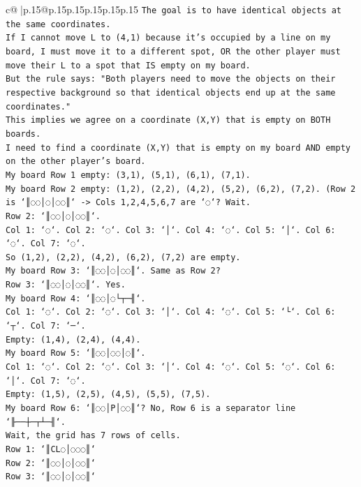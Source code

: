 \documentclass{article}
\begin{document}
{\begin{supertabular}{c@{$\;$}|p{.15\linewidth}@{}p{.15\linewidth}p{.15\linewidth}p{.15\linewidth}p{.15\linewidth}p{.15\linewidth}}
{{{\texttt{The goal is to have identical objects at the same coordinates.} \\
\texttt{If I cannot move L to (4,1) because it's occupied by a line on my board, I must move it to a different spot, OR the other player must move their L to a spot that IS empty on my board.} \\
\texttt{But the rule says: "Both players need to move the objects on their respective background so that identical objects end up at the same coordinates."} \\
\texttt{This implies we agree on a coordinate (X,Y) that is empty on BOTH boards.} \\
\texttt{I need to find a coordinate (X,Y) that is empty on my board AND empty on the other player's board.} \\
\texttt{My board Row 1 empty: (3,1), (5,1), (6,1), (7,1).} \\
\texttt{My board Row 2 empty: (1,2), (2,2), (4,2), (5,2), (6,2), (7,2). (Row 2 is `║◌◌│◌│◌◌║` {-}> Cols 1,2,4,5,6,7 are `◌`? Wait.} \\
\texttt{Row 2: `║◌◌│◌│◌◌║`.} \\
\texttt{Col 1: `◌`. Col 2: `◌`. Col 3: `│`. Col 4: `◌`. Col 5: `│`. Col 6: `◌`. Col 7: `◌`.} \\
\texttt{So (1,2), (2,2), (4,2), (6,2), (7,2) are empty.} \\
\texttt{My board Row 3: `║◌◌│◌│◌◌║`. Same as Row 2?} \\
\texttt{Row 3: `║◌◌│◌│◌◌║`. Yes.} \\
\texttt{My board Row 4: `║◌◌│◌└┬─╢`.} \\
\texttt{Col 1: `◌`. Col 2: `◌`. Col 3: `│`. Col 4: `◌`. Col 5: `└`. Col 6: `┬`. Col 7: `─`.} \\
\texttt{Empty: (1,4), (2,4), (4,4).} \\
\texttt{My board Row 5: `║◌◌│◌◌│◌║`.} \\
\texttt{Col 1: `◌`. Col 2: `◌`. Col 3: `│`. Col 4: `◌`. Col 5: `◌`. Col 6: `│`. Col 7: `◌`.} \\
\texttt{Empty: (1,5), (2,5), (4,5), (5,5), (7,5).} \\
\texttt{My board Row 6: `║◌◌│P│◌◌║`? No, Row 6 is a separator line `╟──┼─┬┴─╢`.} \\
\texttt{Wait, the grid has 7 rows of cells.} \\
\texttt{Row 1: `║CL◌│◌◌◌║`} \\
\texttt{Row 2: `║◌◌│◌│◌◌║`} \\
\texttt{Row 3: `║◌◌│◌│◌◌║`} \\
}}}
\end{supertabular}}
\end{document}
